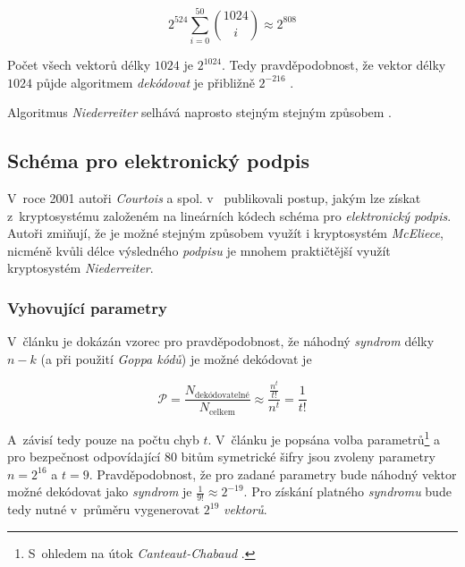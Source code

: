 \documentclass[thesis=M,czech,hidelinks]{FITthesis}[2012/06/26]
\newcommand{\0}{{\textcolor[gray]{0.80}{0}}}
\begin{document}
$$ 2^{524}\sum_{i = 0}^{50}\binom{1024}{i} \approx 2^{808} $$

Počet všech vektorů délky $1024$ je $2^{1024}$. Tedy pravděpodobnost, že vektor
délky $1024$ půjde algoritmem \emph{dekódovat} je přibližně $2^{-216}$
\cite{McEliece}.

Algoritmus \emph{Niederreiter} selhává naprosto stejným stejným způsobem
\cite{Courtois}.

\subsection{Schéma pro elektronický podpis}\label{kap_schema_pro_podpis}

V~roce 2001 autoři \emph{Courtois} a spol. v~\cite{Courtois} publikovali postup,
jakým lze získat z~kryptosystému založeném na lineárních kódech schéma pro
\emph{elektronický podpis}. Autoři zmiňují, že je možné stejným způsobem využít
i kryptosystém \emph{McEliece}, nicméně kvůli délce výsledného \emph{podpisu} je
mnohem praktičtější využít kryptosystém \emph{Niederreiter}.

\subsubsection{Vyhovující parametry}

V~článku je dokázán vzorec pro pravděpodobnost, že náhodný \emph{syndrom} délky
$n-k$ (a při použití \emph{Goppa kódů}) je možné dekódovat je

$$
    \mathcal{P} = \frac{N_{\text{dekódovatelné}}}{N_{\text{celkem}}} \approx
    \frac{\frac{n^t}{t!}}{n^t} = \frac{1}{t!}
$$


A~závisí tedy pouze na počtu chyb $t$. V~článku je popsána volba
parametrů\footnote{
    S~ohledem na útok \emph{Canteaut-Chabaud} \cite{Canteaut}.
} a pro bezpečnost odpovídající $80$ bitům symetrické šifry jsou zvoleny
parametry $n=2^{16}$ a $t=9$.  Pravděpodobnost, že pro zadané parametry bude
náhodný vektor možné dekódovat jako \emph{syndrom} je $\frac{1}{9!} \approx
2^{-19}$. Pro získání platného \emph{syndromu} bude tedy nutné v~průměru
vygenerovat $2^{19}$ \emph{vektorů}.
\end{document}
